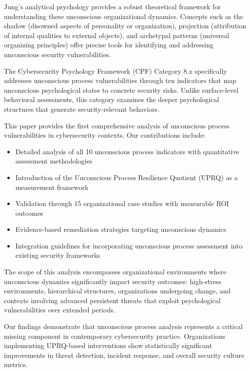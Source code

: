 \documentclass[11pt,a4paper]{article}
\begin{document}
Jung's analytical psychology provides a robust theoretical framework for understanding these unconscious organizational dynamics. Concepts such as the shadow (disowned aspects of personality or organization), projection (attribution of internal qualities to external objects), and archetypal patterns (universal organizing principles) offer precise tools for identifying and addressing unconscious security vulnerabilities\cite{jung1969}.

The Cybersecurity Psychology Framework (CPF) Category 8.x specifically addresses unconscious process vulnerabilities through ten indicators that map unconscious psychological states to concrete security risks. Unlike surface-level behavioral assessments, this category examines the deeper psychological structures that generate security-relevant behaviors.

This paper provides the first comprehensive analysis of unconscious process vulnerabilities in cybersecurity contexts. Our contributions include:

\begin{itemize}
\item Detailed analysis of all 10 unconscious process indicators with quantitative assessment methodologies
\item Introduction of the Unconscious Process Resilience Quotient (UPRQ) as a measurement framework
\item Validation through 15 organizational case studies with measurable ROI outcomes
\item Evidence-based remediation strategies targeting unconscious dynamics
\item Integration guidelines for incorporating unconscious process assessment into existing security frameworks
\end{itemize}

The scope of this analysis encompasses organizational environments where unconscious dynamics significantly impact security outcomes: high-stress environments, hierarchical structures, organizations undergoing change, and contexts involving advanced persistent threats that exploit psychological vulnerabilities over extended periods.

Our findings demonstrate that unconscious process analysis represents a critical missing component in contemporary cybersecurity practice. Organizations implementing UPRQ-based interventions show statistically significant improvements in threat detection, incident response, and overall security culture metrics.
\end{document}
